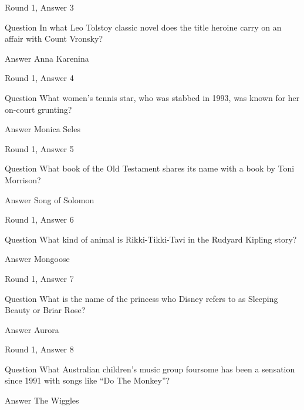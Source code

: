 \documentclass[11pt]{beamer}
\begin{document}
\begin{frame}{Round 1, Answer 3}
\begin{block}{Question}
In what Leo Tolstoy classic novel does the title heroine carry on an affair with Count Vronsky\@?
\end{block}
\pause{}
\begin{block}{Answer}
Anna Karenina
\end{block}
\end{frame}
    

\begin{frame}{Round 1, Answer 4}
\begin{block}{Question}
What women's tennis star, who was stabbed in 1993, was known for her on-court grunting\@?
\end{block}
\pause{}
\begin{block}{Answer}
Monica Seles
\end{block}
\end{frame}
    

\begin{frame}{Round 1, Answer 5}
\begin{block}{Question}
What book of the Old Testament shares its name with a book by Toni Morrison\@?
\end{block}
\pause{}
\begin{block}{Answer}
Song of Solomon
\end{block}
\end{frame}
    

\begin{frame}{Round 1, Answer 6}
\begin{block}{Question}
What kind of animal is Rikki-Tikki-Tavi in the Rudyard Kipling story\@?
\end{block}
\pause{}
\begin{block}{Answer}
Mongoose
\end{block}
\end{frame}
    

\begin{frame}{Round 1, Answer 7}
\begin{block}{Question}
What is the name of the princess who Disney refers to as Sleeping Beauty or Briar Rose\@?
\end{block}
\pause{}
\begin{block}{Answer}
Aurora
\end{block}
\end{frame}
    

\begin{frame}{Round 1, Answer 8}
\begin{block}{Question}
What Australian children's music group foursome has been a sensation since 1991 with songs like ``Do The Monkey''\@?
\end{block}
\pause{}
\begin{block}{Answer}
The Wiggles
\end{block}
\end{frame}
    
\end{document}
